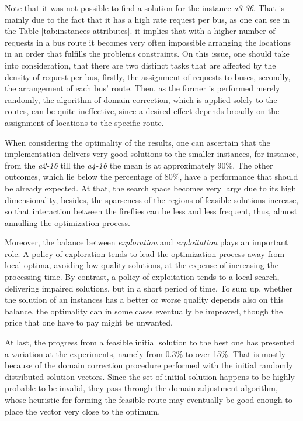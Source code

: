 \documentclass[tuberlin,cic,tc,openright,english,noabntcite,oneside]{iiufrgs}
\begin{document}
Note that it was not possible to find a solution for the instance \emph{a3-36}. That is mainly due to the fact that it has a high rate request per bus, as one can see in the Table \ref{tab:instances-attributes}. it implies that with a higher number of requests in a bus route it becomes very often impossible arranging the locations in an order that fulfills the problems constraints. On this issue, one should take into consideration, that there are two distinct tasks that are affected by the density of request per bus, firstly, the assignment of requests to buses, secondly, the arrangement of each bus' route. Then, as the former is performed merely randomly, the algorithm of domain correction, which is applied solely to the routes, can be quite ineffective, since a desired effect depends broadly on the assignment of locations to the specific route.

When considering the optimality of the results, one can ascertain that the implementation delivers very good solutions to the smaller instances, for instance, from the \emph{a2-16} till the \emph{a4-16} the mean is at approximately 90\%. The other outcomes, which lie below the percentage of 80\%, have a performance that should be already expected. At that, the search space becomes very large due to its high dimensionality, besides, the sparseness of the regions of feasible solutions increase, so that interaction between the fireflies can be less and less frequent, thus, almost annulling the optimization process.

Moreover, the balance between \emph{exploration} and \emph{exploitation} plays an important role. A policy of exploration tends to lead the optimization process away from local optima, avoiding low quality solutions, at the expense of increasing the processing time. By contrast, a policy of exploitation tends to a local search, delivering impaired solutions, but in a short period of time. To sum up, whether the solution of an instances has a better or worse quality depends also on this balance, the optimality can in some cases eventually be improved, though the price that one have to pay might be unwanted.

At last, the progress from a feasible initial solution to the best one has presented a variation at the experiments, namely from 0.3\% to over 15\%. That is mostly because of the domain correction procedure performed with the initial randomly distributed solution vectors. Since the set of initial solution happens to be highly probable to be invalid, they pass through the domain adjustment algorithm, whose heuristic for forming the feasible route may eventually be good enough to place the vector very close to the optimum.
\end{document}
